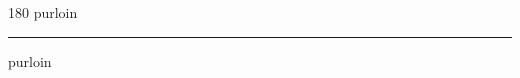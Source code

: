 
\begin{frame}
\begin{center}
\begin{turn}{180}
{\fontsize{2.5cm}{1em}\selectfont purloin}
\end{turn}
\vspace{1em}\par  
\hrule
\vspace{1em}\par  
{\fontsize{2.5cm}{1em}\selectfont purloin}
\end{center}
\end{frame}
